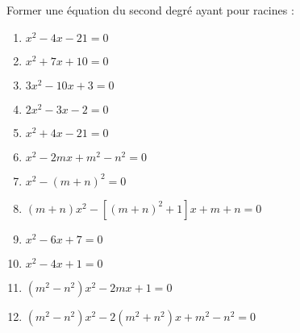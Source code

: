 \begin{solution}
Former une équation du second degré ayant pour racines :
\begin{multicols}{2}
\begin{enumerate}
\item ${{x}^{2}}-4x-21=0$
\item ${{x}^{2}}+7x+10=0$
\item $3{{x}^{2}}-10x+3=0$
\item $2{{x}^{2}}-3x-2=0$
\item ${{x}^{2}}+4x-21=0$
\item ${{x}^{2}}-2mx+{{m}^{2}}-{{n}^{2}}=0$
\item ${{x}^{2}}-{{\left( m+n \right)}^{2}}=0$
\item $\left( m+n \right){{x}^{2}}-\left[ {{\left( m+n \right)}^{2}}+1 \right]x+m+n=0$
\item ${{x}^{2}}-6x+7=0$
\item ${{x}^{2}}-4x+1=0$
\item $\left( {{m}^{2}}-{{n}^{2}} \right){{x}^{2}}-2mx+1=0$
\item $\left( {{m}^{2}}-{{n}^{2}} \right){{x}^{2}}-2\left( {{m}^{2}}+{{n}^{2}} \right)x+{{m}^{2}}-{{n}^{2}}=0$
\end{enumerate}
\end{multicols}
\end{solution}


